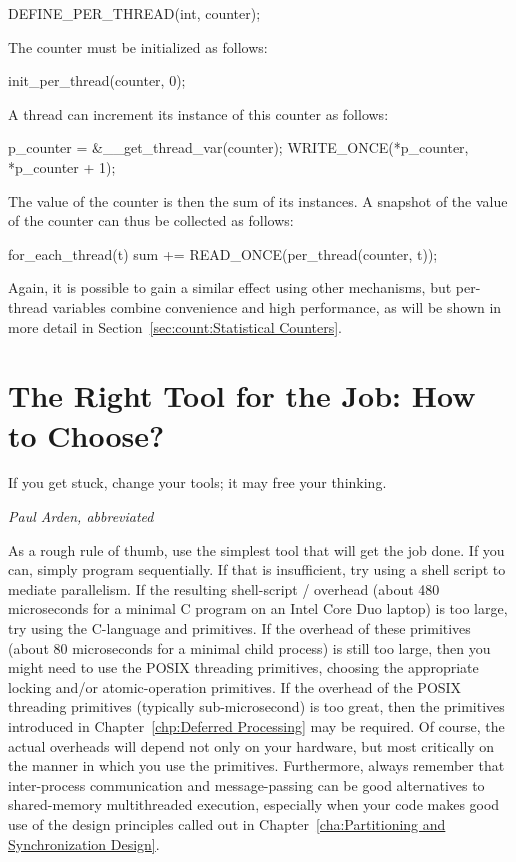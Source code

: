 \begin{VerbatimU}
DEFINE_PER_THREAD(int, counter);
\end{VerbatimU}

The counter must be initialized as follows:

\begin{VerbatimU}
init_per_thread(counter, 0);
\end{VerbatimU}

A thread can increment its instance of this counter as follows:

\begin{VerbatimU}
p_counter = &__get_thread_var(counter);
WRITE_ONCE(*p_counter, *p_counter + 1);
\end{VerbatimU}

The value of the counter is then the sum of its instances.
A snapshot of the value of the counter can thus be collected
as follows:

\begin{VerbatimU}
for_each_thread(t)
  sum += READ_ONCE(per_thread(counter, t));
\end{VerbatimU}

Again, it is possible to gain a similar effect using other mechanisms,
but per-thread variables combine convenience and high performance,
as will be shown in more detail in
Section~\ref{sec:count:Statistical Counters}.

\section{The Right Tool for the Job: How to Choose?}
\label{sec:toolsoftrade:The Right Tool for the Job: How to Choose?}
%
\epigraph{If you get stuck, change your tools; it may free your thinking.}
	 {\emph{Paul Arden, abbreviated}}

As a rough rule of thumb, use the simplest tool that will get the job done.
If you can, simply program sequentially.
If that is insufficient, try using a shell script to mediate parallelism.
If the resulting shell-script / overhead
(about 480 microseconds for a minimal C program on an Intel Core Duo
laptop) is too
large, try using the C-language  and  primitives.
If the overhead of these primitives (about 80 microseconds for a minimal
child process) is still too large, then you
might need to use the POSIX threading primitives, choosing the appropriate
locking and/or atomic-operation primitives.
If the overhead of the POSIX threading primitives (typically sub-microsecond)
is too great, then the primitives introduced in
Chapter~\ref{chp:Deferred Processing} may be required.
Of course, the actual overheads will depend not only on your hardware,
but most critically on the manner in which you use the primitives.
Furthermore, always remember that inter-process communication and
message-passing can be good alternatives to shared-memory multithreaded
execution, especially when your code makes good use of the design
principles called out in
Chapter~\ref{cha:Partitioning and Synchronization Design}.

